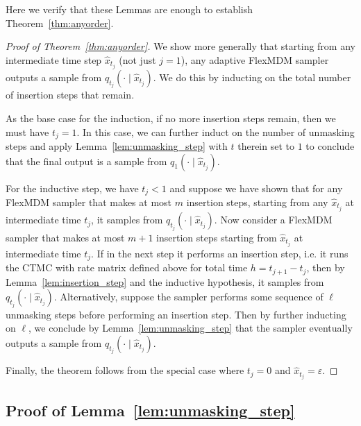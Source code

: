 Here we verify that these Lemmas are enough to establish Theorem~\ref{thm:anyorder}.

\begin{proof}[Proof of Theorem~\ref{thm:anyorder}]
    We show more generally that starting from any intermediate time step $\hat{x}_{t_j}$ (not just $j = 1$), any adaptive FlexMDM sampler outputs a sample from $q_{t_j}(\cdot \mid \hat{x}_{t_j})$. We do this by inducting on the total number of insertion steps that remain.
    
    As the base case for the induction, if no more insertion steps remain, then we must have $t_j = 1$. In this case, we can further induct on the number of unmasking steps and apply Lemma~\ref{lem:unmasking_step} with $t$ therein set to $1$ to conclude that the final output is a sample from $q_1(\cdot \mid \hat{x}_{t_j})$.

    For the inductive step, we have $t_j < 1$ and suppose we have shown that for any FlexMDM sampler that makes at most $m$ insertion steps, starting from any $\hat{x}_{t_j}$ at intermediate time $t_j$, it samples from $q_{t_j}(\cdot\mid \hat{x}_{t_j})$. Now consider a FlexMDM sampler that makes at most $m + 1$ insertion steps starting from $\hat{x}_{t_j}$ at intermediate time $t_j$. If in the next step it performs an insertion step, i.e. it runs the CTMC with rate matrix defined above for total time $h = t_{j+1} - t_j$, then by Lemma~\ref{lem:insertion_step} and the inductive hypothesis, it samples from $q_{t_j}(\cdot \mid \hat{x}_{t_j})$. Alternatively, suppose the sampler performs some sequence of $\ell$ unmasking steps before performing an insertion step. Then by further inducting on $\ell$, we conclude by Lemma~\ref{lem:unmasking_step} that the sampler eventually outputs a sample from $q_{t_j}(\cdot \mid \hat{x}_{t_j})$.

    Finally, the theorem follows from the special case where $t_j = 0$ and $\hat{x}_{t_j} = \varepsilon$.
\end{proof}


\subsection{Proof of Lemma~\ref{lem:unmasking_step}}
\label{sec:unmasking_step}


